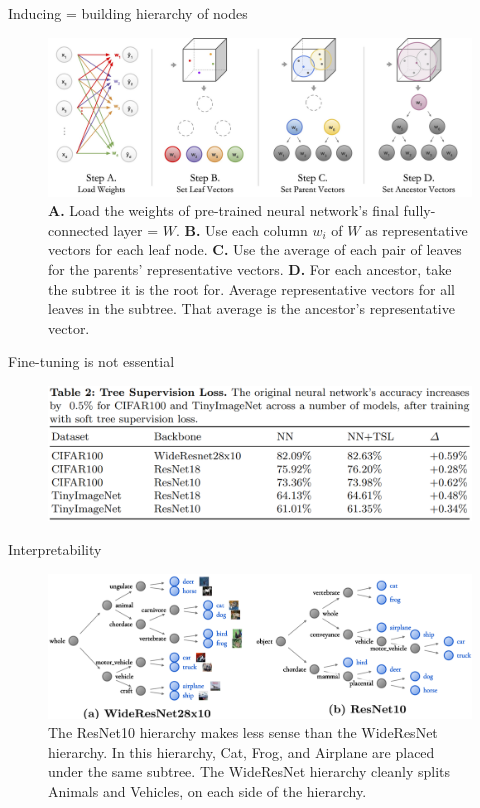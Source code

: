 \documentclass{beamer}
\begin{document}
\begin{frame}{Inducing = building hierarchy of nodes}

\begin{figure}[h]
\includegraphics[width=\textwidth]{img/build}
\caption{\textbf{A.} Load the weights of pre-trained
neural network’s final fully-connected layer = $W$. \textbf{B.}
Use each column $w_i$ of $W$ as representative vectors for each leaf node. \textbf{C.} Use the average of each
pair of leaves for the parents’ representative vectors. \textbf{D.} For each ancestor, take the
subtree it is the root for. Average representative vectors for all leaves in the subtree.
That average is the ancestor’s representative vector.}
\end{figure}

\end{frame}
\begin{frame}{Fine-tuning is not essential}

\begin{figure}[h]
\includegraphics[width=\textwidth]{img/loss}
\end{figure}

\end{frame}
\begin{frame}{Interpretability}

\begin{figure}[h]
\includegraphics[width=\textwidth]{img/interpret}
\caption{The ResNet10 hierarchy makes less sense than the WideResNet hierarchy. In this hierarchy, Cat, Frog, and Airplane are placed under the same subtree. The WideResNet hierarchy cleanly splits Animals and Vehicles, on each side of the hierarchy.}
\end{figure}

\end{frame}
\end{document}
